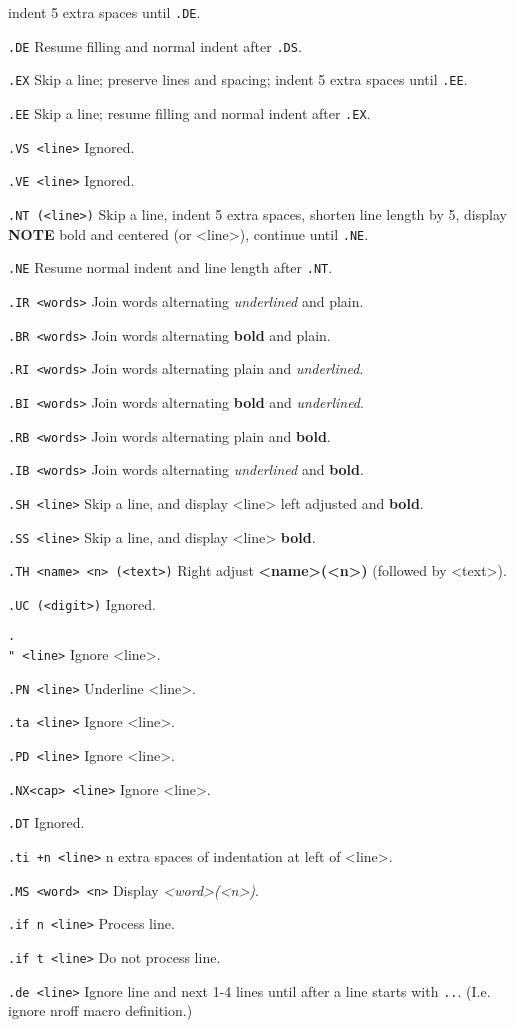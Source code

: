 			indent 5 extra spaces until {\tt .DE}.
\item{\tt .DE}		Resume filling and normal indent after {\tt .DS}.
\item{\tt .EX}		Skip a line; preserve lines and spacing;
			indent 5 extra spaces until {\tt .EE}.
\item{\tt .EE}		Skip a line; resume filling and normal indent
			after {\tt .EX}.
\item{\tt .VS~<line>}	Ignored.
\item{\tt .VE~<line>}	Ignored.
\item{\tt .NT~(<line>)}	Skip a line, indent 5 extra spaces, shorten
			line length by 5, display {\bf NOTE} bold and
			centered (or <line>), continue until {\tt .NE}.
\item{\tt .NE}		Resume normal indent and line length after
			{\tt .NT}.
\item{\tt .IR~<words>}	Join words alternating {\it underlined} and plain.
\item{\tt .BR~<words>}	Join words alternating {\bf bold} and plain.
\item{\tt .RI~<words>}	Join words alternating plain and {\it underlined}.
\item{\tt .BI~<words>}	Join words alternating {\bf bold} and {\it underlined}.
\item{\tt .RB~<words>}	Join words alternating plain and {\bf bold}.
\item{\tt .IB~<words>}	Join words alternating {\it underlined} and {\bf bold}.
\item{\tt .SH~<line>}	Skip a line, and display <line> left adjusted
			and {\bf bold}.
\item{\tt .SS~<line>}	Skip a line, and display <line> {\bf bold}.
\item{\tt .TH~<name>~<n>~(<text>)}
			Right adjust {\bf <name>(<n>)} (followed by <text>).
\item{\tt .UC~(<digit>)}
			Ignored.
\item{\tt .\\"~<line>}	Ignore <line>.
\item{\tt .PN~<line>}	Underline <line>.
\item{\tt .ta~<line>}	Ignore <line>.
\item{\tt .PD~<line>}	Ignore <line>.
\item{\tt .NX<cap>~<line>}
			Ignore <line>.
\item{\tt .DT}		Ignored.
\item{\tt .ti~+n~<line>}
			n extra spaces of indentation at left of <line>.
\item{\tt .MS~<word>~<n>}
			Display {\it <word>(<n>)}.
\item{\tt .if~n~<line>}	Process line.
\item{\tt .if~t~<line>} Do not process line.
\item{\tt .de~<line>}	Ignore line and next 1-4 lines until after a line
			starts with {\tt ..}.  (I.e. ignore nroff macro
			definition.)

